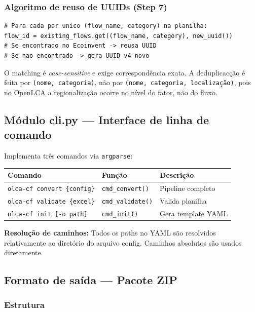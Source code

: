 \subsubsection{Algoritmo de reuso de UUIDs (Step 7)}

\begin{lstlisting}[style=python]
# Para cada par unico (flow_name, category) na planilha:
flow_id = existing_flows.get((flow_name, category), new_uuid())
# Se encontrado no Ecoinvent -> reusa UUID
# Se nao encontrado -> gera UUID v4 novo
\end{lstlisting}

O matching \'e \textit{case-sensitive} e exige correspond\^encia exata. A deduplicac\c{c}\~ao \'e feita por \texttt{(nome, categoria)}, n\~ao por \texttt{(nome, categoria, localiza\c{c}\~ao)}, pois no OpenLCA a regionaliza\c{c}\~ao ocorre no n\'ivel do fator, n\~ao do fluxo.

\subsection{M\'odulo cli.py --- Interface de linha de comando}

Implementa tr\^es comandos via \texttt{argparse}:

\begin{table}[H]
\centering
\begin{tabular}{lll}
\toprule
\textbf{Comando} & \textbf{Fun\c{c}\~ao} & \textbf{Descri\c{c}\~ao} \\
\midrule
\texttt{olca-cf convert \{config\}} & \texttt{cmd\_convert()} & Pipeline completo \\
\texttt{olca-cf validate \{excel\}} & \texttt{cmd\_validate()} & Valida planilha \\
\texttt{olca-cf init [-o path]} & \texttt{cmd\_init()} & Gera template YAML \\
\bottomrule
\end{tabular}
\end{table}

\textbf{Resolu\c{c}\~ao de caminhos:} Todos os paths no YAML s\~ao resolvidos relativamente ao diret\'orio do arquivo config. Caminhos absolutos s\~ao usados diretamente.

\subsection{Formato de sa\'ida --- Pacote ZIP}

\subsubsection{Estrutura}

